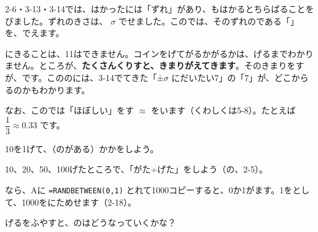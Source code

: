 2-6・3-13・3-14では、はかったには「ずれ」があり、もはかるとちらばることをびました。ずれのきさは、 $\sigma$ でせました。このでは、そのずれのである「」を、でえます。

にきることは、11はできません。コインをげてがるかがるかは、げるまでわかりません。ところが、\textbf{たくさんくりすと、きまりがえてきます}。そのきまりをすが、\textbf{}です。こののには、3-14でてきた「±$\sigma$ にだいたい7」の「7」が、どこからるのかもわかります。

なお、このでは「ほぼしい」をす $\approx$ をいます（くわしくは5-8）。たとえば $\dfrac{1}{3}\approx0.33$ です。

\begin{yattemiyou}
\begin{enumerate}[label={\bkcircled[bkGreen]{\arabic*}}, leftmargin=2.4\zw, itemsep=1pt, topsep=2pt]
\item 10を1げて、（のがある）かかをしよう。
\item 10、20、50、100げたところで、「がた÷げた」をしよう（の、2-5）。
\item {}なら、Aに \texttt{=RANDBETWEEN(0,1)} とれて1000コピーすると、0か1がます。1をとして、1000をにためせます（2-18）。
\item {}げるをふやすと、のはどうなっていくかな？
\end{enumerate}
\end{yattemiyou}

